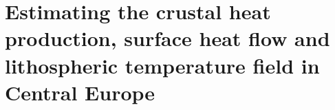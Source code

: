 \chapter{Estimating the crustal heat production, surface heat flow and lithospheric temperature field in Central Europe}
\label{c:ThermAppl}

